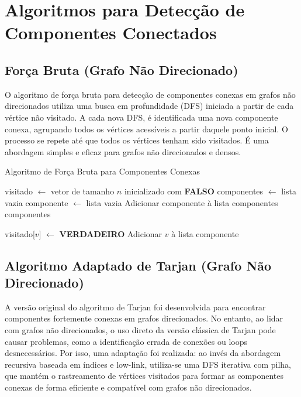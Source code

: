 \documentclass[12pt]{article}
\begin{document}
\section{Algoritmos para Detecção de Componentes Conectados}

\subsection{Força Bruta (Grafo Não Direcionado)}

O algoritmo de força bruta para detecção de componentes conexas em grafos não direcionados utiliza uma busca em profundidade (DFS) iniciada a partir de cada vértice não visitado. A cada nova DFS, é identificada uma nova componente conexa, agrupando todos os vértices acessíveis a partir daquele ponto inicial. O processo se repete até que todos os vértices tenham sido visitados. É uma abordagem simples e eficaz para grafos não direcionados e densos.

\begin{algorithm}[H]
\caption{Algoritmo de Força Bruta para Componentes Conexas}
\begin{algorithmic}[1]
    \State visitado $\gets$ vetor de tamanho $n$ inicializado com \textbf{FALSO}
    \State componentes $\gets$ lista vazia
            \State componente $\gets$ lista vazia
            \State {}
            \State Adicionar componente à lista componentes
        \EndIf
    \EndFor
    \State \Return componentes
\EndFunction

    \State visitado[$v$] $\gets$ \textbf{VERDADEIRO}
    \State Adicionar $v$ à lista componente
            \State {}
        \EndIf
    \EndFor
\EndFunction
\end{algorithmic}
\end{algorithm}

\subsection{Algoritmo Adaptado de Tarjan (Grafo Não Direcionado)}

A versão original do algoritmo de Tarjan foi desenvolvida para encontrar componentes fortemente conexas em grafos direcionados. No entanto, ao lidar com grafos não direcionados, o uso direto da versão clássica de Tarjan pode causar problemas, como a identificação errada de conexões ou loops desnecessários. Por isso, uma adaptação foi realizada: ao invés da abordagem recursiva baseada em índices e low-link, utiliza-se uma DFS iterativa com pilha, que mantém o rastreamento de vértices visitados para formar as componentes conexas de forma eficiente e compatível com grafos não direcionados.
\end{document}
